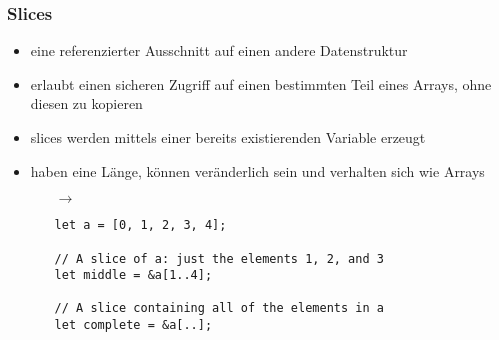 \documentclass[a4paper,12pt]{article}
\begin{document}
\subsubsection*{Slices}
	\begin{itemize}
	  \item eine referenzierter Ausschnitt auf einen andere Datenstruktur
	  \item erlaubt einen sicheren Zugriff auf einen bestimmten Teil eines Arrays, ohne diesen zu kopieren
	  \item slices werden mittels einer bereits existierenden Variable erzeugt
	  \item haben eine Länge, können veränderlich sein und verhalten sich wie Arrays
	  \begin{itemize}
	      \item[$\rightarrow$]
	      \item []
	       \begin{verbatim}
let a = [0, 1, 2, 3, 4];

// A slice of a: just the elements 1, 2, and 3
let middle = &a[1..4]; 

// A slice containing all of the elements in a	  
let complete = &a[..]; 
	  \end{verbatim}
	  \end{itemize}
	\end{itemize}
	
\end{document}
